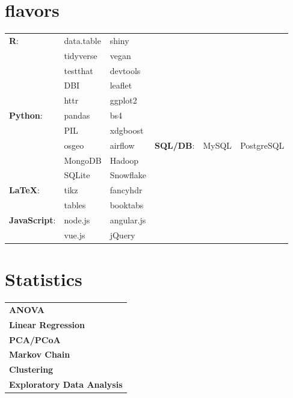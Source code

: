 \documentclass[10pt]{article}%
\begin{document}
\begin{minipage}[ht]{.25\linewidth}
   \section*{\faCubes{} flavors}%
   \flushright
   {\small
      \begin{tabularx}{\linewidth}{p{.24\linewidth}XX}
         \textbf{R}: & data.table & shiny \\
                     & tidyverse  & vegan \\
                     & testthat   & devtools \\
                     & DBI        & leaflet \\
                     & httr       & ggplot2 \\
         \textbf{Python}: & pandas & bs4 \\
                          & PIL    & xdgboost \\
                          & osgeo  & airflow & 
         \textbf{SQL/DB}: & MySQL & PostgreSQL \\
                       & MongoDB & Hadoop \\
                       & SQLite  & Snowflake \\
         \textbf{\LaTeX }:  & tikz   & fancyhdr \\
                           & tables & booktabs \\
         \textbf{JavaScript}: & node.js & angular.js \\
                              & vue.js & jQuery
     \end{tabularx}}
     \flushleft%
   \section*{\faBarChart{} Statistics}%
   \flushright
   {\small
      \begin{tabularx}{\linewidth}{X}
        \textbf{ANOVA} \\
        \textbf{Linear Regression} \\
        \textbf{PCA/PCoA} \\
        \textbf{Markov Chain} \\
        \textbf{Clustering} \\
        \textbf{Exploratory Data Analysis}
      \end{tabularx}}
      \flushleft%
\end{minipage}%
\end{document}
